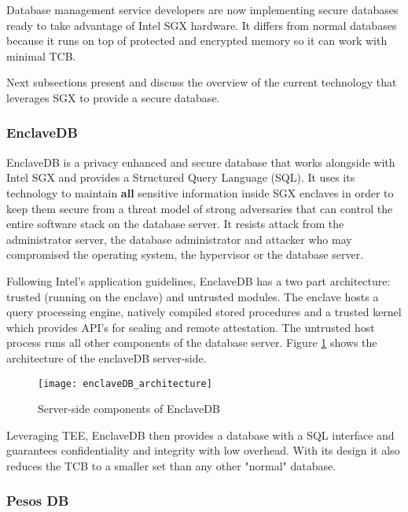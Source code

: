 Database management service developers are now implementing secure databases ready to take advantage of Intel \gls{SGX} hardware. It differs from normal databases because it runs on top of protected and encrypted memory so it can work with minimal \gls{TCB}.

Next subsections present and discuss the overview of the current technology that leverages \gls{SGX} to provide a secure database.

\subsubsection{EnclaveDB}
\label{sssec:enclave_db}

EnclaveDB \cite{enclavedb:1} is a privacy enhanced and secure database that works alongside with Intel \gls{SGX} and provides a Structured Query Language (SQL). It uses its technology to maintain \textbf{all} sensitive information inside \gls{SGX} enclaves in order to keep them secure from a threat model of strong adversaries that can control the entire software stack  on the database server. It resists attack from the administrator server, the database administrator and attacker who may compromised the operating system, the hypervisor or the database server.

Following Intel's application guidelines, EnclaveDB has a two part architecture: trusted (running on the enclave) and untrusted modules. The enclave hosts a query processing engine, natively compiled stored procedures and a trusted kernel which provides API's for sealing and remote attestation. The untrusted host process runs all other components of the database server. Figure \ref{fig:enclaveDB_architecture} shows the architecture of the enclaveDB server-side.

\begin{figure}[htbp]
	\centering
	{\texttt{[image: enclaveDB\_architecture]}}%
	\caption{Server-side components of EnclaveDB}
	\label{fig:enclaveDB_architecture}
\end{figure}

Leveraging \gls{TEE}, EnclaveDB then provides a database with a \gls{SQL} interface and guarantees confidentiality and integrity with low overhead. With its design it also reduces the \gls{TCB} to a smaller set than any other "normal" database.

\subsubsection{Pesos DB}
\label{sssec:pesos_db}

